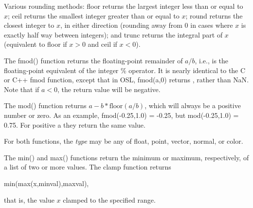 \documentclass[11pt,letterpaper]{book}
\def\color{{\cf color}\xspace}
\def\normal{{\cf normal}\xspace}
\def\point{{\cf point}\xspace}
\def\vector{{\cf vector}\xspace}
\begin{document}
   

Various rounding methods: {\cf floor} returns the largest integer less
than or equal to $x$; {\cf ceil} returns the smallest integer greater than
or equal to $x$; {\cf round} returns the closest integer to $x$, in
either direction (rounding away from 0 in cases where $x$ is exactly
half way between integers); and {\cf trunc} returns the integral part of $x$
(equivalent to {\cf floor} if $x>0$ and {\cf ceil} if $x<0$).
\apiend


The {\cf fmod()} function returns the floating-point remainder of $a/b$,
i.e., is the floating-point equivalent of the integer {\cf \%} operator.
It is nearly identical to the C or C++ {\cf fmod} function, except that
in OSL, {\cf fmod(a,0)} returns {}, rather than {\cf NaN}.  Note
that if $a < 0$, the return value will be negative.

The {\cf mod()} function returns $a - b*\mbox{floor}(a/b)$, which will
always be a positive number or zero.  
As an example, {\cf fmod(-0.25,1.0) = -0.25}, but {\cf mod(-0.25,1.0) =
  0.75}.  For positive {\cf a} they return the same value.

For both functions, the \emph{type} may be any of {\cf float}, \point,
\vector, \normal, or \color.
\apiend

  
The {\cf min()} and {\cf max()} functions return the minimum or maximum,
respectively, of a list of two or more values.  The {\cf clamp}
function returns

\hspace{2em} {\cf min(max(x,minval),maxval)},

\noindent that is, the value $x$ clamped to the specified range.
\apiend
\end{document}
